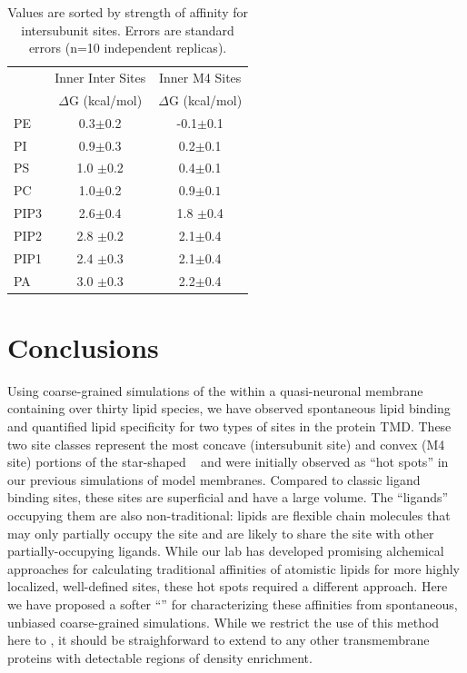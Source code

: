 \begin{table}
	\caption[\Newaffinities ($\Delta$G) of neutral lipids for both sites in the inner leaflet, by head group.] {Values are sorted by strength of affinity for intersubunit sites. Errors are standard errors (n=10 independent replicas). }
    \centering
    \begin{tabular}{|l||c|c|}
    \hline
	{} &  Inner Inter Sites&  Inner M4 Sites\\
	{} & $\Delta$G (kcal/mol) & $\Delta$G (kcal/mol) \\
	\hline
	PE& 0.3$\pm$0.2& -0.1$\pm$0.1\\
	PI&0.9$\pm$0.3 &  0.2$\pm$0.1\\
	PS&1.0 $\pm$0.2	&  0.4$\pm$0.1\\
	PC &1.0$\pm$0.2 &	0.9$\pm0.1$ \\
	PIP3	&2.6$\pm$0.4	 &  1.8 $\pm$0.4\\
	PIP2	&2.8 $\pm$0.2	&  2.1$\pm$0.4\\
	PIP1	&2.4 $\pm$0.3	&  2.1$\pm$0.4\\
	PA	&3.0 $\pm$0.3	&  2.2$\pm$0.4\\
	\hline
    \end{tabular}
    \label{tab:dGInnerHG}
\end{table}

\section{Conclusions}

\label{con}

Using coarse-grained simulations of the \nachr{} within a quasi-neuronal membrane containing over thirty lipid species, we have observed spontaneous lipid binding and quantified lipid specificity for two types of sites in the protein TMD.  These two site classes represent the most concave (intersubunit site) and convex (M4 site) portions of the star-shaped \nachr~ and were initially observed as ``hot spots'' in our previous simulations\cite{Woods2019,Tong2019} of model membranes. Compared to classic ligand binding sites, these sites are superficial and have a large volume. The ``ligands'' occupying them are also non-traditional: lipids are flexible chain molecules that may only partially occupy the site and are likely to share the site with other partially-occupying ligands.  While our lab has developed promising alchemical approaches\cite{Salari2018} for calculating traditional affinities of atomistic lipids for more highly localized, well-defined sites, these hot spots required a different approach. Here we have proposed a softer ``\newaffinity'' for characterizing these affinities from spontaneous, unbiased coarse-grained simulations. While we restrict the use of this method here to \nachr, it should be straighforward to extend to any other transmembrane proteins with detectable regions of density enrichment. 

